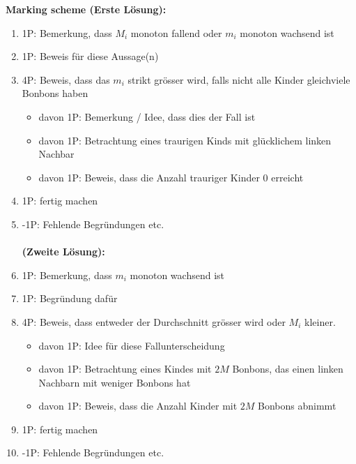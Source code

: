 {\textbf{Marking scheme (Erste Lösung):}
\begin{enumerate}
\item 1P: Bemerkung, dass $M_i$ monoton fallend oder $m_i$ monoton wachsend ist
\item 1P: Beweis für diese Aussage(n)
\item 4P: Beweis, dass das $m_i$ strikt grösser wird, falls nicht alle Kinder gleichviele Bonbons haben
\begin{itemize}
    \item davon 1P: Bemerkung / Idee, dass dies der Fall ist
    \item davon 1P: Betrachtung eines traurigen Kinds mit glücklichem linken Nachbar
    \item davon 1P: Beweis, dass die Anzahl trauriger Kinder 0 erreicht
\end{itemize}
\item 1P: fertig machen 
\item -1P: Fehlende Begründungen etc.
\\
\\
\textbf{(Zweite Lösung):}
\item 1P: Bemerkung, dass $m_i$ monoton wachsend ist
\item 1P: Begründung dafür
\item 4P: Beweis, dass entweder der Durchschnitt grösser wird oder $M_i$ kleiner.
\begin{itemize}
    \item davon 1P: Idee für diese Fallunterscheidung
    \item davon 1P: Betrachtung eines Kindes mit $2M$ Bonbons, das einen linken Nachbarn mit weniger Bonbons hat
    \item davon 1P: Beweis, dass die Anzahl Kinder mit $2M$ Bonbons abnimmt 
\end{itemize}
\item 1P: fertig machen
\item -1P: Fehlende Begründungen etc.
\end{enumerate}
}
